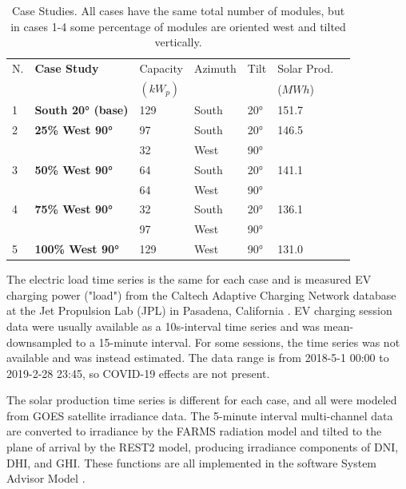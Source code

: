 \documentclass[conference]{IEEEtran}
\begin{document}
\begin{table}
  \centering
  \caption{Case Studies. All cases have the same total number of modules, but in cases 1-4 some percentage of modules are oriented west and tilted vertically. }
  \label{tab:casestudies}
  \setlength{\tabcolsep}{3pt}
  \begin{tabular}{@{}p{0.4cm} @{}p{2cm} l l l l l@{}}
    \hline
    N. & \textbf{Case Study}       & Capacity & Azimuth & Tilt & Solar Prod. \\
       &                           & $(kW_p)$ &         &      & ($MWh$)     \\
    \hhline {= = = = = =}
    1  & \textbf{South 20° (base)} & 129      & South   & 20°  & 151.7       \\
    \hline
    2  & \textbf{25\% West 90°}    & 97       & South   & 20°  & 146.5       \\
       &                           & 32       & West    & 90°  &             \\
    \hline
    3  & \textbf{50\% West 90°}    & 64       & South   & 20°  & 141.1       \\
       &                           & 64       & West    & 90°  &             \\
    \hline
    4  & \textbf{75\% West 90°}    & 32       & South   & 20°  & 136.1       \\
       &                           & 97       & West    & 90°  &             \\
    \hline
    5  & \textbf{100\% West 90°}   & 129      & West    & 90°  & 131.0       \\
    \hline
  \end{tabular}
\end{table}

The electric load time series is the same for each case and is measured EV charging power ("load") from the Caltech Adaptive Charging Network database at the Jet Propulsion Lab (JPL) in Pasadena, California \cite{Lee2021}. EV charging session data were usually available as a 10s-interval time series and was mean-downsampled to a 15-minute interval. For some sessions, the time series was not available and was instead estimated. The data range is from 2018-5-1 00:00 to 2019-2-28 23:45, so COVID-19 effects are not present. 

The solar production time series is different for each case, and all were modeled from GOES satellite irradiance data\cite{Sengupta2018}. The 5-minute interval multi-channel data are converted to irradiance by the FARMS \cite{Sengupta2018} radiation model and tilted to the plane of arrival by the REST2 \cite{gueymard2008rest2} model, producing irradiance components of DNI, DHI, and GHI. These functions are all implemented in the software System Advisor Model \cite{blair2018system}. 
\end{document}
